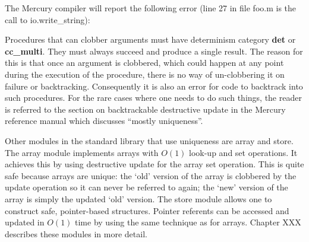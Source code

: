 \documentclass[a4paper,11pt,notitlepage,onecolumn]{book}
\begin{document}
The Mercury compiler will report the following error
(line 27 in file \textsf{foo.m} is the call to \textsf{io.write\_string}):

\begin{small}

\begin{ptabular}
\nextline
{}
\nextline
{}
\nextline
{}
\nextline
\end{ptabular}

\end{small}

\Note Procedures that can clobber arguments must have determinism category
\textsf{\textbf{det}} or \textsf{\textbf{cc\_multi}}.  They must always succeed and produce a single result.
The reason for this is that once an argument is clobbered, which could
happen at any point during the execution of the procedure, there is no way
of un-clobbering it on failure or backtracking.  Consequently it is also an
error for code to backtrack into such procedures.  For the rare cases where
one needs to do such things, the reader is referred to the section on
backtrackable destructive update in the Mercury reference manual which
discusses ``mostly uniqueness''.

Other modules in the standard library that use uniqueness are \textsf{array} and
\textsf{store}.  The \textsf{array} module implements arrays with $O(1)$ look-up and set
operations.  It achieves this by using destructive update for the array set
operation.  This is quite safe because arrays are unique: the `old' version
of the array is clobbered by the update operation so it can never
be referred to again; the `new' version of the array is simply the updated
`old' version.  The \textsf{store} module allows one to construct safe,
pointer-based structures.  Pointer referents can be accessed and updated in
$O(1)$ time by using the same technique as for arrays.  Chapter XXX
describes these modules in more detail.
\end{document}
